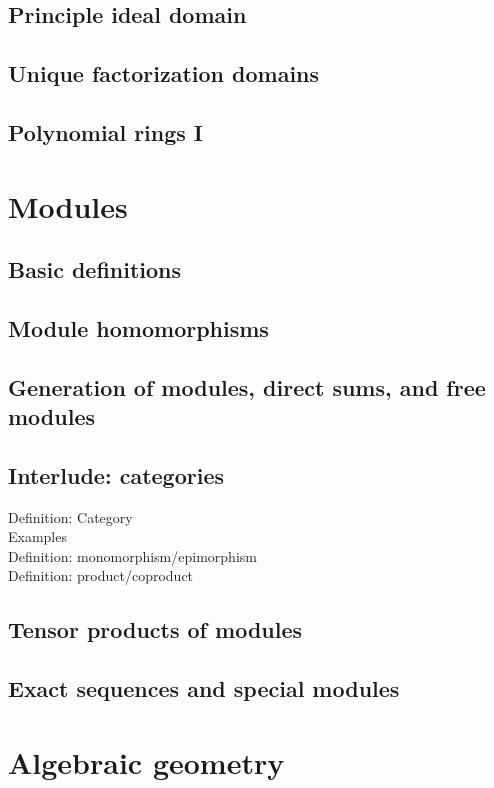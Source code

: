 \documentclass[12pt]{article}
\begin{document}
\subsection{Principle ideal domain} 
\label{sec:princ-ideal-doma}

\subsection{Unique factorization domains}
\label{sec:uniq-fact-doma}

\subsection{Polynomial rings I}
\label{sec:polynomial-rings-i}

\section{Modules}
\label{sec:modules}

\subsection{Basic definitions}
\label{sec:basic-definitions}

\subsection{Module homomorphisms}
\label{sec:module-homomorphisms}

\subsection{Generation of modules, direct sums, and free modules}
\label{sec:gener-modul-direct}

\subsection{Interlude: categories}
\label{sec:interl-categ}

\begin{description}
\item[Definition: Category] 
\item[Examples] 
\item[Definition: monomorphism/epimorphism]
\item[Definition: product/coproduct] 
\end{description}

\subsection{Tensor products of modules}
\label{sec:tens-prod-modul}

\subsection{Exact sequences and special modules}
\label{sec:exact-sequ-spec}

\section{Algebraic geometry}
\label{sec:algebraic-geometry}
\end{document}
